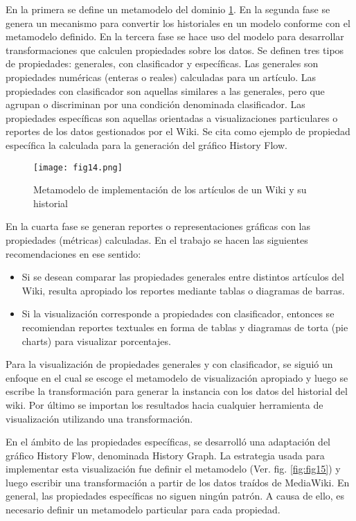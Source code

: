En la primera se define un metamodelo del dominio \ref{fig:fig14}. En la segunda fase se genera un mecanismo para convertir los historiales en un modelo conforme con el metamodelo definido. En la tercera fase se hace uso del modelo para desarrollar transformaciones que calculen propiedades sobre los datos. Se definen tres tipos de propiedades: generales, con clasificador y específicas. Las generales son propiedades numéricas (enteras o reales) calculadas para un artículo. Las propiedades con clasificador son aquellas similares a las generales, pero que agrupan o discriminan por una condición denominada clasificador. Las propiedades específicas son aquellas orientadas a visualizaciones particulares o reportes de los datos gestionados por el Wiki. Se cita como ejemplo de propiedad específica la calculada para la generación del gráfico History Flow.

\begin{figure}[htp]
  \centering
  \texttt{[image: fig14.png]}
  \caption{Metamodelo de implementación de los artículos de un Wiki y su historial \cite[Fig. 2]{Sca08}}
  \label{fig:fig14}
\end{figure}

En la cuarta fase se generan reportes o representaciones gráficas con las propiedades (métricas) calculadas. En el trabajo se hacen las siguientes recomendaciones en ese sentido:

\begin{itemize}
  \item Si se desean comparar las propiedades generales entre distintos artículos del Wiki, resulta apropiado los reportes mediante tablas o diagramas de barras.
  \item Si la visualización corresponde a propiedades con clasificador, entonces se recomiendan reportes textuales en forma de tablas y diagramas de torta (pie charts) para visualizar porcentajes.
\end{itemize}

Para la visualización de propiedades generales y con clasificador, se siguió un enfoque en el cual se escoge el metamodelo de visualización apropiado y luego se escribe la transformación para generar la instancia con los datos del historial del wiki. Por último se importan los resultados hacia cualquier herramienta de visualización utilizando una transformación.

En el ámbito de las propiedades específicas, se desarrolló una adaptación del gráfico History Flow, denominada History Graph. La estrategia usada para implementar esta visualización fue definir el metamodelo (Ver. fig. \ref{fig:fig15}) y luego escribir una transformación a partir de los datos traídos de MediaWiki. En general, las propiedades específicas no siguen ningún patrón. A causa de ello, es necesario definir un metamodelo particular para cada propiedad.


